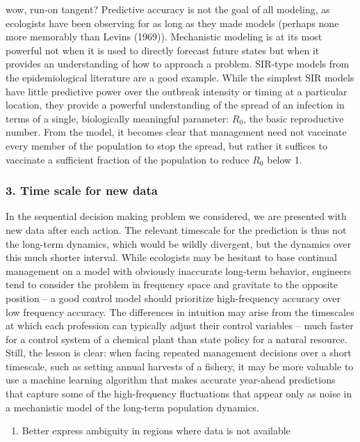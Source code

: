 \documentclass[author-year, review]{elsarticle} %
\begin{document}
 wow, run-on tangent? Predictive accuracy is not the goal of all
modeling, as ecologists have been observing for as long as they made
models (perhaps none more memorably than Levins (1969)). Mechanistic
modeling is at its most powerful not when it is used to directly
forecast future states but when it provides an understanding of how to
approach a problem. SIR-type models from the epidemiological literature
are a good example. While the simplest SIR models have little predictive
power over the outbreak intensity or timing at a particular location,
they provide a powerful understanding of the spread of an infection in
terms of a single, biologically meaningful parameter: $R_0$, the basic
reproductive number. From the model, it becomes clear that management
need not vaccinate every member of the population to stop the spread,
but rather it suffices to vaccinate a sufficient fraction of the
population to reduce $R_0$ below 1.

\subsubsection{3. Time scale for new data}

In the sequential decision making problem we considered, we are
presented with new data after each action. The relevant timescale for
the prediction is thus not the long-term dynamics, which would be wildly
divergent, but the dynamics over this much shorter interval. While
ecologists may be hesitant to base continual management on a model with
obviously inaccurate long-term behavior, engineers tend to consider the
problem in frequency space and gravitate to the opposite position -- a
good control model should prioritize high-frequency accuracy over low
frequency accuracy. The differences in intuition may arise from the
timescales at which each profession can typically adjust their control
variables -- much faster for a control system of a chemical plant than
state policy for a natural resource. Still, the lesson is clear: when
facing repeated management decisions over a short timescale, such as
setting annual harvests of a fishery, it may be more valuable to use a
machine learning algorithm that makes accurate year-ahead predictions
that capture some of the high-frequency fluctuations that appear only as
noise in a mechanistic model of the long-term population dynamics.

\begin{enumerate}
\def\labelenumi{\arabic{enumi}.}
\setcounter{enumi}{1}
\itemsep1pt\parskip0pt
\item
  Better express ambiguity in regions where data is not available
\end{enumerate}
\end{document}
